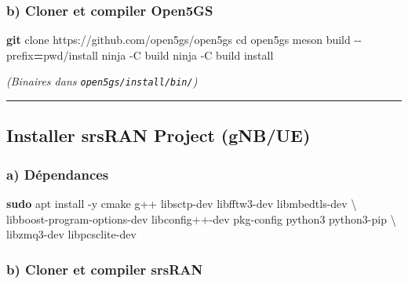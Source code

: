 \documentclass[
  french,
]{article}
\newenvironment{Shaded}{\begin{snugshade}}{\end{snugshade}}
\newcommand{\AttributeTok}[1]{\textcolor[rgb]{0.13,0.29,0.53}{#1}}
\newcommand{\BuiltInTok}[1]{#1}
\newcommand{\DataTypeTok}[1]{\textcolor[rgb]{0.13,0.29,0.53}{#1}}
\newcommand{\ExtensionTok}[1]{#1}
\newcommand{\FunctionTok}[1]{\textcolor[rgb]{0.13,0.29,0.53}{\textbf{#1}}}
\newcommand{\KeywordTok}[1]{\textcolor[rgb]{0.13,0.29,0.53}{\textbf{#1}}}
\newcommand{\NormalTok}[1]{#1}
\newcommand{\OperatorTok}[1]{\textcolor[rgb]{0.81,0.36,0.00}{\textbf{#1}}}
\begin{document}
\subsubsection{b) Cloner et compiler
Open5GS}\label{b-cloner-et-compiler-open5gs}

\begin{Shaded}
\begin{Highlighting}[]
\FunctionTok{git}\NormalTok{ clone https://github.com/open5gs/open5gs}
\BuiltInTok{cd}\NormalTok{ open5gs}
\ExtensionTok{meson}\NormalTok{ build }\AttributeTok{{-}{-}prefix}\OperatorTok{=}\KeywordTok{\textasciigrave{}}\BuiltInTok{pwd}\KeywordTok{\textasciigrave{}}\NormalTok{/install}
\ExtensionTok{ninja} \AttributeTok{{-}C}\NormalTok{ build}
\ExtensionTok{ninja} \AttributeTok{{-}C}\NormalTok{ build install}
\end{Highlighting}
\end{Shaded}

\emph{(Binaires dans \texttt{open5gs/install/bin/})}

\begin{center}\rule{0.5\linewidth}{0.5pt}\end{center}

\subsection{Installer srsRAN Project
(gNB/UE)}\label{installer-srsran-project-gnbue}

\subsubsection{a) Dépendances}\label{a-duxe9pendances-1}

\begin{Shaded}
\begin{Highlighting}[]
\FunctionTok{sudo}\NormalTok{ apt install }\AttributeTok{{-}y}\NormalTok{ cmake g++ libsctp{-}dev libfftw3{-}dev libmbedtls{-}dev }\DataTypeTok{\textbackslash{}}
\NormalTok{  libboost{-}program{-}options{-}dev libconfig++{-}dev pkg{-}config python3 python3{-}pip }\DataTypeTok{\textbackslash{}}
\NormalTok{  libzmq3{-}dev libpcsclite{-}dev}
\end{Highlighting}
\end{Shaded}

\subsubsection{b) Cloner et compiler
srsRAN}\label{b-cloner-et-compiler-srsran}
\end{document}
